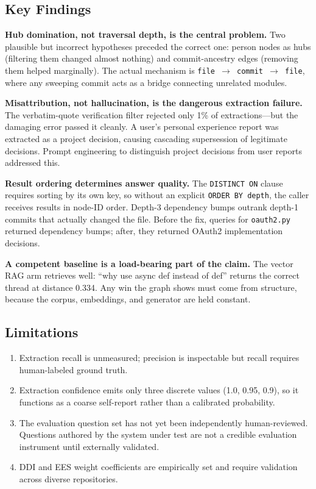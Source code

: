\documentclass[conference]{IEEEtran}
\begin{document}
\subsection{Key Findings}

\textbf{Hub domination, not traversal depth, is the central problem.} Two plausible but incorrect hypotheses preceded the correct one: person nodes as hubs (filtering them changed almost nothing) and commit-ancestry edges (removing them helped marginally). The actual mechanism is \texttt{file $\rightarrow$ commit $\rightarrow$ file}, where any sweeping commit acts as a bridge connecting unrelated modules.

\textbf{Misattribution, not hallucination, is the dangerous extraction failure.} The verbatim-quote verification filter rejected only 1\% of extractions---but the damaging error passed it cleanly. A user's personal experience report was extracted as a project decision, causing cascading supersession of legitimate decisions. Prompt engineering to distinguish project decisions from user reports addressed this.

\textbf{Result ordering determines answer quality.} The \texttt{DISTINCT ON} clause requires sorting by its own key, so without an explicit \texttt{ORDER BY depth}, the caller receives results in node-ID order. Depth-3 dependency bumps outrank depth-1 commits that actually changed the file. Before the fix, queries for \texttt{oauth2.py} returned dependency bumps; after, they returned OAuth2 implementation decisions.

\textbf{A competent baseline is a load-bearing part of the claim.} The vector RAG arm retrieves well: ``why use async def instead of def'' returns the correct thread at distance 0.334. Any win the graph shows must come from structure, because the corpus, embeddings, and generator are held constant.

\subsection{Limitations}
\begin{enumerate}
    \item Extraction recall is unmeasured; precision is inspectable but recall requires human-labeled ground truth.
    \item Extraction confidence emits only three discrete values (1.0, 0.95, 0.9), so it functions as a coarse self-report rather than a calibrated probability.
    \item The evaluation question set has not yet been independently human-reviewed. Questions authored by the system under test are not a credible evaluation instrument until externally validated.
    \item DDI and EES weight coefficients are empirically set and require validation across diverse repositories.
\end{enumerate}
\end{document}
